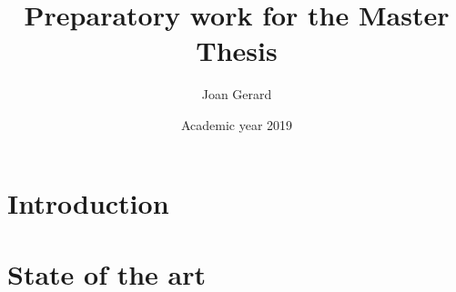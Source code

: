 \documentclass[12pt,twoside]{report}
\title{Preparatory work for the Master Thesis}
\author{Joan Gerard}
\date{Academic year 2019}
\begin{document}


%

\tableofcontents

\listoffigures

\listoftables

\chapter{Introduction}


\chapter{State of the art}


%

%

%

%

\printbibliography
\end{document}
